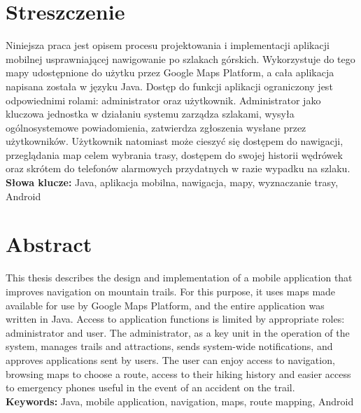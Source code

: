 \section{Streszczenie}
Niniejsza praca jest opisem procesu projektowania i implementacji aplikacji mobilnej usprawniającej nawigowanie po szlakach górskich. Wykorzystuje do tego mapy udostępnione do użytku przez Google Maps Platform, a cała aplikacja napisana została w języku Java. Dostęp do funkcji aplikacji ograniczony jest odpowiednimi rolami: administrator oraz użytkownik. Administrator jako kluczowa jednostka w działaniu systemu zarządza szlakami, wysyła ogólnosystemowe powiadomienia, zatwierdza zgłoszenia wysłane przez użytkowników. Użytkownik natomiast może cieszyć się dostępem do nawigacji, przeglądania map celem wybrania trasy, dostępem do swojej historii wędrówek oraz skrótem do telefonów alarmowych przydatnych w razie wypadku na szlaku. \\
\textbf{Słowa klucze:} Java, aplikacja mobilna, nawigacja, mapy, wyznaczanie trasy, Android

\section*{Abstract}
This thesis describes the design and implementation of a mobile application that improves navigation on mountain trails. For this purpose, it uses maps made available for use by Google Maps Platform, and the entire application was written in Java. Access to application functions is limited by appropriate roles: administrator and user. The administrator, as a key unit in the operation of the system, manages trails and attractions, sends system-wide notifications, and approves applications sent by users. The user can enjoy access to navigation, browsing maps to choose a route, access to their hiking history and easier access to emergency phones useful in the event of an accident on the trail. \\
\textbf{Keywords:} Java, mobile application, navigation, maps, route mapping, Android